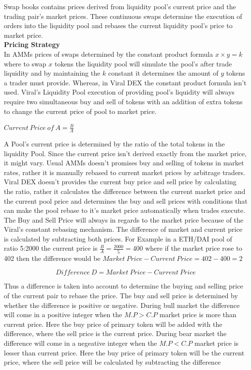 \documentclass[conference]{IEEEtran}
\begin{document}
Swap books contains prices derived from liquidity pool's current price and the trading pair's market prices. These continuous swaps determine the execution of orders into the liquidity pool and rebases the current liquidity pool's price to market price.\\

\textbf{Pricing Strategy}\\

In AMMs prices of swaps determined by the constant product formula $x \times  y=k$ where to swap $x$ tokens the liquidity pool will simulate the pool's after trade liquidity and by maintaining the $k$ constant it determines the amount of $y$ tokens a trader must provide. Whereas, in Viral DEX the constant product formula isn't used. Viral's Liquidity Pool execution of providing pool's liquidity will always require two simultaneous buy and sell of tokens with an addition of extra tokens to change the current price of pool to market price.


\begin{center}
$Current\:Price\:of\:A = \frac{B}{A}$
\end{center}

A Pool's current price is determined by the ratio of the total tokens in the liquidity Pool. Since the current price isn't derived exactly from the market price, it might vary. Usual AMMs doesn't promises buy and selling of tokens in market rates, rather it is manually rebased to current market prices by arbitrage traders. Viral DEX doesn't provides the current buy price and sell price by calculating the ratio, rather it calculates the difference between the current market price and the current pool price and determines the buy and sell prices with conditions that can make the pool rebase to it's market price automatically when trades execute.\\

The Buy and Sell Price will always in regards to the market price because of the Viral's constant rebasing mechanism. The difference of market and current price is calculated by subtracting both prices. For Example in a ETH/DAI pool of ratio 5:2000 the current price is $\frac{B}{A}=\frac{2000}{5}=400$ where if the market price rose to 402 then the difference would be $Market\:Price - Current\:Price=402-400=2$

\[Difference\:D = Market\:Price - Current\:Price\]



Thus a difference is taken into account to determine the buying and selling price of the current pair to rebase the price. The buy and sell price is determined by whether the difference is positive or negative. During bull market the difference will come in a positive integer when the $M.P>C.P$ market price is more than current price. Here the buy price of primary token will be added with the difference, where the sell price is the current price. During bear market the difference will come in a negeative integer when the $M.P<C.P$ market price is lesser than current price. Here the buy price of primary token will be the current price, where the sell price will be calculated by subtracting the difference\\
\end{document}

